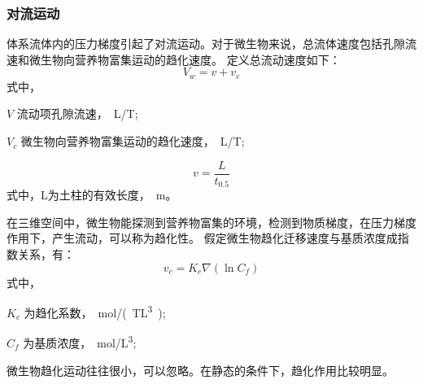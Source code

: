 \subsubsection{对流运动}
体系流体内的压力梯度引起了对流运动。对于微生物来说，总流体速度包括孔隙流速和微生物向营养物富集运动的趋化速度。
定义总流动速度如下：
\begin{equation}
V_w=v+v_c
\end{equation}
式中，
\begin{paralist}
	\item[$V$]流动项孔隙流速，\SI{}{L/T};
	\item[$V_c$]微生物向营养物富集运动的趋化速度，\SI{}{L/T};
\end{paralist}
\begin{equation}
v=\dfrac{L}{t_{0.5}}
\end{equation}                        
式中，L为土柱的有效长度，\SI{}{m}。\par
在三维空间中，微生物能探测到营养物富集的环境，检测到物质梯度，在压力梯度作用下，产生流动，可以称为趋化性。
假定微生物趋化迁移速度与基质浓度成指数关系，有：
\begin{equation}
v_c=K_c\nabla(\ln C_f)
\end{equation}
式中，
\begin{paralist}
	\item[$K_c$]为趋化系数，\SI{}{mol/(TL^3)};
	\item[$C_f$]为基质浓度，\SI{}{mol/L^3};
\end{paralist}
微生物趋化运动往往很小，可以忽略。在静态的条件下，趋化作用比较明显。
